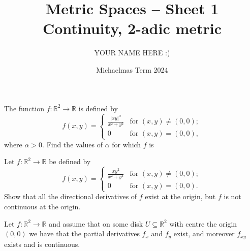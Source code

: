 \documentclass[answers]{exam}
\title{Metric Spaces -- Sheet 1\\Continuity, 2-adic metric}
\author{YOUR NAME HERE :)}
\date{Michaelmas Term 2024}
\begin{document}
\begin{questions}

\question%
The function $f:\mathbb R^2\to\mathbb R$ is defined by \[
	f(x,y)=\begin{cases}
		\frac{|xy|^\alpha}{x^2+y^2} & \text{for }(x,y)\neq(0,0);\\
		0 & \text{for }(x,y)=(0,0),
	\end{cases}
\] where $\alpha>0$. Find the values of $\alpha$ for which $f$ is



\question%
Let $f:\mathbb R^2\to\mathbb R$ be defined by \[
	f(x,y)=\begin{cases}
		\frac{xy^2}{x^2+y^4} & \text{for }(x,y)\neq(0,0);\\
		0 & \text{for }(x,y)=(0,0).
	\end{cases}
\] Show that all the directional derivatives of $f$ exist at the origin, but $f$ is not continuous at the origin.



\question%
Let $f:\mathbb R^2\to\mathbb R$ and assume that on some disk $U\subseteq\mathbb R^2$ with centre the origin $(0,0)$ we have that the partial derivatives $f_x$ and $f_y$ exist, and moreover $f_{x y}$ exists and is continuous.
\end{questions}
\end{document}
